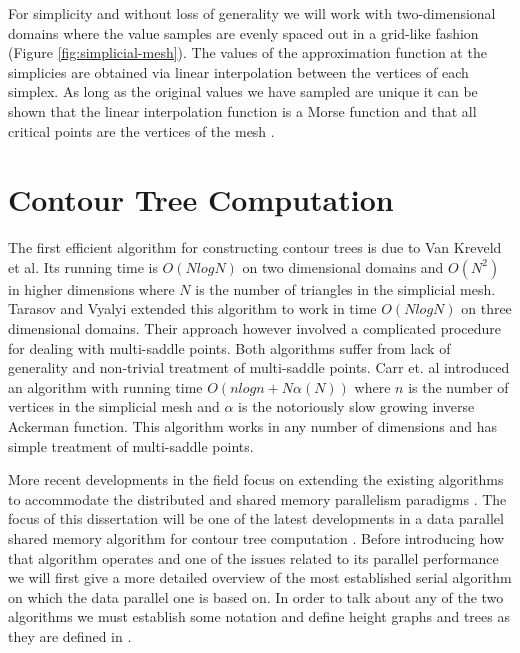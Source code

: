 For simplicity and without loss of generality we will work with two-dimensional domains where the value samples are evenly spaced out in a grid-like fashion (Figure \ref{fig:simplicial-mesh}). The values of the approximation function at the simplicies are obtained via linear interpolation between the vertices of each simplex. As long as the original values we have sampled are unique it can be shown that the linear interpolation function is a Morse function and that all critical points are the vertices of the mesh \cite{curvature-embeded-polyhedra}.

\section{Contour Tree Computation}



The first efficient algorithm for constructing contour trees \cite{first-ct-algo} is due to Van Kreveld et al. Its running time is $O(NlogN)$ on two dimensional domains and $O(N^2)$ in higher dimensions where $N$ is the number of triangles in the simplicial mesh. Tarasov and Vyalyi \cite{second-ct-algo} extended this algorithm to work in time $O(NlogN)$ on three dimensional domains. Their approach however involved a complicated procedure for dealing with multi-saddle points. Both algorithms suffer from lack of generality and non-trivial treatment of multi-saddle points. Carr et. al \cite{ct-big-paper} introduced an algorithm with running time $O(nlogn + N\alpha(N))$ where $n$ is the number of vertices in the simplicial mesh and $\alpha$ is the notoriously slow growing inverse Ackerman function. This algorithm works in any number of dimensions and has simple treatment of multi-saddle points.

More recent developments in the field focus on extending the existing algorithms to accommodate the distributed \cite{distributed-ct-algo, distributed-ct-algo-2} and shared memory parallelism paradigms \cite{parallel-peak-pruning, parallel-ct-1}. The focus of this dissertation will be one of the latest developments in a data parallel shared memory algorithm for contour tree computation
\cite{parallel-peak-pruning}. Before introducing how that algorithm operates and one of the issues related to its parallel performance we will first give a more detailed overview of the most established serial algorithm \cite{ct-big-paper} on which the data parallel one is based on. In order to talk about any of the two algorithms we must establish some notation and define height graphs and trees as they are defined in \cite{carr-masters}.


